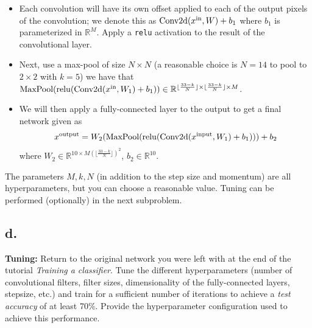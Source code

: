 \documentclass{article}
\newcommand{\field}[1]{\mathbb{#1}}
\newcommand{\1}{\mathbf{1}}
\newcommand{\R}{\field{R}} %
\begin{document}
{\begin{itemize}
    \item Each convolution will have its own offset applied to each of the output pixels of the convolution; we denote this as $\mathrm{Conv2d}(x^{\rm in}, W) + b_1$ where $b_1$ is parameterized in $\R^M$. Apply a \texttt{relu} activation to the result of the convolutional layer. 
    \item Next, use a max-pool of size $N \times N$ (a reasonable choice is $N=14$ to pool to $2 \times 2$ with $k=5$) we have that $\textrm{MaxPool}( \mathrm{relu}( \mathrm{Conv2d}(x^{\rm in}, W_1)+b_1)) \in \R^{\lfloor\frac{33-k}{N}\rfloor \times \lfloor\frac{33-k}{N}\rfloor \times M}$.
    \item We will then apply a fully-connected layer to the output to get a final network given as
        \begin{align*}
        x^{\rm output} = W_2 (\textrm{MaxPool}( \mathrm{relu}( \mathrm{Conv2d}(x^{\rm input}, W_1)+b_1))) + b_2
        \end{align*}
  where $W_2 \in \R^{10 \times M (\lfloor\frac{33-k}{N}\rfloor)^2}$, $b_2 \in \R^{10}$.
\end{itemize}

The parameters $M,k,N$ (in addition to the step size and momentum) are all hyperparameters, but you can choose a reasonable value. Tuning can be performed (optionally) in the next subproblem.

\subsection*{d.}

\textbf{Tuning:} Return to the original network you were left with at the end of the tutorial \emph{Training a classifier}. Tune the different hyperparameters (number of convolutional filters, filter sizes, dimensionality of the fully-connected layers, stepsize, etc.) and train for a sufficient number of iterations to achieve a \emph{test accuracy} of at least 70\%. Provide the hyperparameter configuration used to achieve this performance.

}
\end{document}
